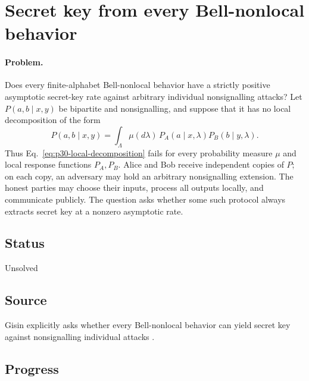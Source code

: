 \section{Secret key from every Bell-nonlocal behavior}
\label{sec:problem-30}

\paragraph{Problem.}
Does every finite-alphabet Bell-nonlocal behavior have a strictly positive
asymptotic secret-key rate against arbitrary individual nonsignalling attacks?
Let $P(a,b\mid x,y)$ be bipartite and nonsignalling, and suppose that it has no
local decomposition of the form
\begin{equation}
  P(a,b\mid x,y)
  =\int_\Lambda \mu(d\lambda)\,
    P_A(a\mid x,\lambda)P_B(b\mid y,\lambda).
  \label{eq:p30-local-decomposition}
\end{equation}
Thus Eq.~\eqref{eq:p30-local-decomposition} fails for every probability
measure $\mu$ and local response functions $P_A,P_B$.  Alice and Bob receive
independent copies of $P$; on each copy, an adversary may hold an arbitrary
nonsignalling extension.  The honest parties may choose their inputs, process
all outputs locally, and communicate publicly.  The question asks whether
some such protocol always extracts secret key at a nonzero asymptotic rate.

\subsection*{Status}

Unsolved

\subsection*{Source}

Gisin explicitly asks whether every Bell-nonlocal behavior can yield secret
key against nonsignalling individual attacks
.

\subsection*{Progress}

